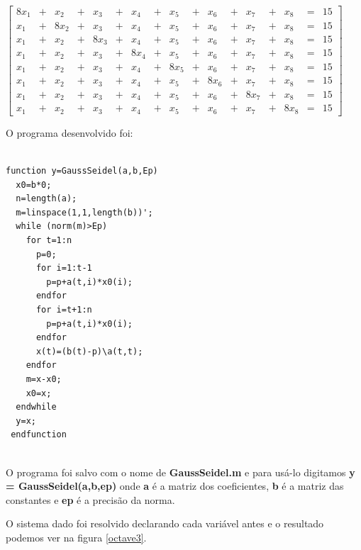\documentclass[11pt, openright, a4paper, brazil, openany, oneside]{abntex2}
\begin{document}
\begin{center}

$\left[ \begin{array}{ccccccccccccccccc}

8x_1 & + & x_2 & + & x_3 & + & x_4 & + & x_5 & + & x_6 & + & x_7 & + & x_8 & = & 15 \\ x_1 & + & 8x_2 & + & x_3 & + & x_4 & + & x_5 & + & x_6 & + & x_7 & + & x_8 & = & 15 \\ x_1 & + & x_2 & + & 8x_3 & + & x_4 & + & x_5 & + & x_6 & + & x_7 & + & x_8 & = & 15 \\ x_1 & + & x_2 & + & x_3 & + & 8x_4 & + & x_5 & + & x_6 & + & x_7 & + & x_8 & = & 15 \\ x_1 & + & x_2 & + & x_3 & + & x_4 & + & 8x_5 & + & x_6 & + & x_7 & + & x_8 & = & 15 \\ x_1 & + & x_2 & + & x_3 & + & x_4 & + & x_5 & + & 8x_6 & + & x_7 & + & x_8 & = & 15 \\ x_1 & + & x_2 & + & x_3 & + & x_4 & + & x_5 & + & x_6 & + & 8x_7 & + & x_8 & = & 15 \\ x_1 & + & x_2 & + & x_3 & + & x_4 & + & x_5 & + & x_6 & + & x_7 & + & 8x_8 & = & 15

\end{array} \right]$


\end{center}

O programa desenvolvido foi:
\begin{verbatim}

function y=GaussSeidel(a,b,Ep)
  x0=b*0;
  n=length(a);
  m=linspace(1,1,length(b))';
  while (norm(m)>Ep)
    for t=1:n
      p=0;
      for i=1:t-1
        p=p+a(t,i)*x0(i);
      endfor
      for i=t+1:n
        p=p+a(t,i)*x0(i);
      endfor
      x(t)=(b(t)-p)\a(t,t);
    endfor
    m=x-x0;
    x0=x;
  endwhile
  y=x;
 endfunction
 
\end{verbatim}

O programa foi salvo com o nome de \textbf{GaussSeidel.m} e para usá-lo digitamos \textbf{y = GaussSeidel(a,b,ep)} onde \textbf{a} é a matriz dos coeficientes, \textbf{b} é a matriz das constantes e \textbf{ep} é a precisão da norma.

O sistema dado foi resolvido declarando cada variável antes e o resultado podemos ver na figura \ref{octave3}.
\end{document}
